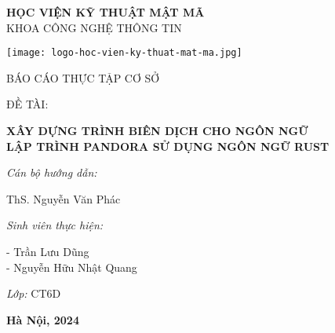 \NoBgThispage
{}

\fontsize{16}{19.2pt}\selectfont 
\vspace{-1cm}
\begin{center}
    \textbf{ HỌC VIỆN KỸ THUẬT MẬT MÃ}\\
    KHOA CÔNG NGHỆ THÔNG TIN
\end{center}



\vspace{-0.5cm}

\begin{center}
    \texttt{[image: logo-hoc-vien-ky-thuat-mat-ma.jpg]}
\end{center}

\vspace{-1cm}
\begin{center}
    BÁO CÁO THỰC TẬP CƠ SỞ \\
\end{center}

\vspace{-0.5cm}
ĐỀ TÀI:
\fontsize{18}{21.6pt}\selectfont 
\begin{center}
    \textbf{XÂY DỰNG TRÌNH BIÊN DỊCH CHO NGÔN NGỮ\\LẬP TRÌNH PANDORA SỬ DỤNG NGÔN NGỮ RUST\\}
\end{center}

\vspace{1cm}
{\bf{
    \hspace{\parindent}\textit{Cán bộ hướng dẫn:}

     ThS. Nguyễn Văn Phác

    \hspace{\parindent}\textit{Sinh viên thực hiện:}

     - Trần Lưu Dũng\\
     - Nguyễn Hữu Nhật Quang
    
    \hspace{\parindent}\textit{Lớp: } CT6D
    
}}

\vfill 
\begin{center}
   \bf{Hà Nội, 2024}
\end{center}
